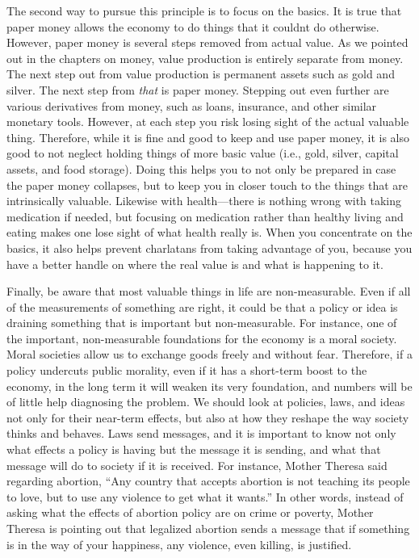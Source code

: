 \documentclass[letterpaper]{article}
\begin{document}
{\color{black}
The second way to pursue this principle is to focus on the basics. It is
true that paper money allows the economy to do things that it
couldn{\textquotesingle}t do otherwise. However, paper money is several
steps removed from actual value. As we pointed out in the chapters on
money, value production is entirely separate from money. The next step
out from value production is permanent assets such as gold and silver.
The next step from \textit{that} is paper money. Stepping out even
further are various derivatives from money, such as loans, insurance,
and other similar monetary tools. However, at each step you risk losing
sight of the actual valuable thing. Therefore, while it is fine and
good to keep and use paper money, it is also good to not neglect
holding things of more basic value
\textcolor[rgb]{0.32941177,0.5529412,0.83137256}{(i.e.,} gold, silver,
capital assets, and food
storage\textcolor[rgb]{0.32941177,0.5529412,0.83137256}{)}. Doing this
helps you to not only be prepared in case the paper money collapses,
but \textcolor[rgb]{0.32941177,0.5529412,0.83137256}{to} keep
\textcolor[rgb]{0.32941177,0.5529412,0.83137256}{you }in closer touch
to the things that are intrinsically valuable. Likewise with
health—there is nothing wrong with taking medication if needed, but
focusing on medication rather than healthy living and eating makes
\textcolor[rgb]{0.32941177,0.5529412,0.83137256}{one} lose sight of
what health \textcolor[rgb]{0.32941177,0.5529412,0.83137256}{really}
is. When you concentrate on the basics, it also helps prevent
charlatans from taking advantage of you, because you have a better
handle on where the real value is and what is happening to it.}

{\color{black}
Finally, be aware that most valuable things in life are non-measurable.
Even if all of the measurements of something are right, it could be
that a policy or idea is draining something that is important but
non-measurable.\textcolor[rgb]{0.32941177,0.5529412,0.83137256}{  For
instance, one of the important, non-measurable foundations for the
economy is a moral society.  Moral societies allow us to exchange goods
freely and without fear.  Therefore, if a policy undercuts public
morality, even if it has a short-term boost to the economy, in the long
term it will weaken its very foundation, and numbers will be of little
help diagnosing the problem. } We should look at policies, laws, and
ideas not only for their near-term effects, but also at how they
reshape the way society thinks and behaves. Laws send messages, and it
is important to know not only what effects a policy is having but the
message it is sending, and what that message will do to society if it
is received. For instance, Mother Theresa said
\textcolor[rgb]{0.32941177,0.5529412,0.83137256}{regarding abortion,}
“Any country that accepts abortion is not teaching its people to love,
but to use any violence to get what it wants.”  In other words, instead
of asking what the effects of abortion policy are on crime or poverty,
Mother Theresa is pointing out that legalized abortion sends a message
that if something is in the way of your happiness, any violence, even
killing, is justified.  }
\end{document}
